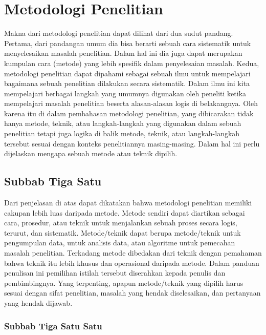 \newpage
\chapter{Metodologi Penelitian}

Makna dari metodologi penelitian dapat dilihat dari dua sudut pandang. Pertama, dari pandangan umum dia bisa berarti sebuah cara sistematik untuk menyelesaikan masalah penelitian. Dalam hal ini dia juga dapat merupakan kumpulan cara (metode) yang lebih spesifik dalam penyelesaian masalah. Kedua, metodologi penelitian dapat dipahami sebagai sebuah ilmu untuk mempelajari bagaimana sebuah penelitian dilakukan secara sistematik. Dalam ilmu ini kita mempelajari berbagai langkah yang umumnya digunakan oleh peneliti ketika mempelajari masalah penelitian beserta alasan-alasan logis di belakangnya. Oleh karena itu di dalam pembahasan metodologi penelitian, yang dibicarakan tidak hanya metode, teknik, atau langkah-langkah yang digunakan dalam sebuah penelitian tetapi juga logika di balik metode, teknik, atau langkah-langkah tersebut sesuai dengan konteks penelitiannya masing-masing. Dalam hal ini perlu dijelaskan mengapa sebuah metode atau teknik dipilih. 


\section{Subbab Tiga Satu}
Dari penjelasan di atas dapat dikatakan bahwa metodologi penelitian memiliki cakupan lebih luas daripada metode. Metode sendiri dapat diartikan sebagai cara, prosedur, atau teknik untuk menjalankan sebuah proses secara logis, terurut, dan sistematik. Metode/teknik dapat berupa metode/teknik untuk pengumpulan data, untuk analisis data, atau algoritme untuk pemecahan masalah penelitian. Terkadang metode dibedakan dari teknik dengan pemahaman bahwa teknik itu lebih khusus dan operasional daripada metode. Dalam panduan penulisan ini pemilihan istilah tersebut diserahkan kepada penulis dan pembimbingnya. Yang terpenting, apapun metode/teknik yang dipilih harus sesuai dengan sifat penelitian, masalah yang hendak diselesaikan, dan pertanyaan yang hendak dijawab. 

\subsection{Subbab Tiga Satu Satu}

